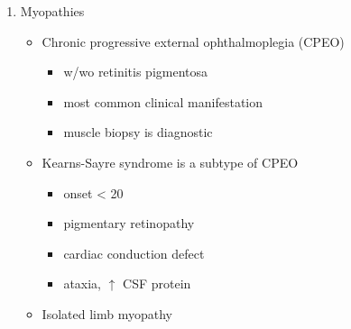 \documentclass{scrartcl}
\begin{document}
\begin{enumerate}
\item Myopathies
\label{sec:orgf2b7085}
\begin{itemize}
\item Chronic progressive external ophthalmoplegia (CPEO)
\begin{itemize}
\item w/wo retinitis pigmentosa
\item most common clinical manifestation
\item muscle biopsy is diagnostic
\end{itemize}
\item Kearns-Sayre syndrome is a subtype of CPEO
\begin{itemize}
\item onset \textless{} 20
\item pigmentary retinopathy
\item cardiac conduction defect
\item ataxia, \(\uparrow\) CSF protein
\end{itemize}
\item Isolated limb myopathy
\end{itemize}


\end{enumerate}
\end{document}
